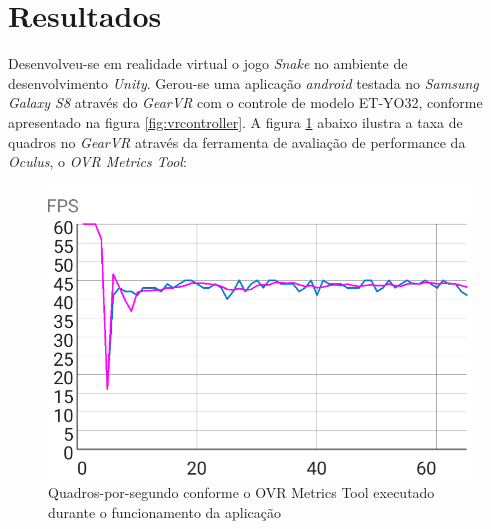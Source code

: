 \documentclass[conference]{IEEEtran}
\begin{document}



\section{Resultados} \label{sec:results}
Desenvolveu-se em realidade virtual o jogo \textit{Snake} no ambiente de desenvolvimento \textit{Unity}. Gerou-se uma aplicação \textit{android} testada no \textit{Samsung Galaxy S8} através do \textit{GearVR} com o controle de modelo ET-YO32, conforme apresentado na figura \ref{fig:vrcontroller}. A figura \ref{fig:VRPerformanceChart} abaixo ilustra a taxa de quadros no \textit{GearVR} através da ferramenta de avaliação de performance da \textit{Oculus}, o \textit{OVR Metrics Tool}:

\begin{figure}[H] \label{fig:VRPerformanceChart}
\centering
\includegraphics[scale=0.5]{VRPerformance}
\caption{Quadros-por-segundo conforme o OVR Metrics Tool executado durante o funcionamento da aplicação }
\end{figure}
\end{document}
